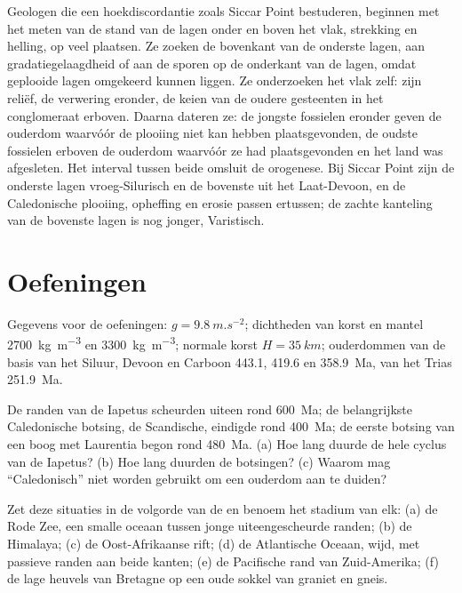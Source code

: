 \begin{inthefield}
Geologen die een hoekdiscordantie zoals Siccar Point bestuderen, beginnen met het meten van de
stand van de lagen onder en boven het vlak, strekking en helling, op veel plaatsen. Ze zoeken
de bovenkant van de onderste lagen, aan gradatiegelaagdheid of aan de sporen op de onderkant van de lagen,
omdat geplooide lagen omgekeerd kunnen liggen. Ze onderzoeken het vlak zelf: zijn reliëf, de
verwering eronder, de keien van de oudere gesteenten in het conglomeraat erboven. Daarna
dateren ze: de jongste fossielen eronder geven de ouderdom waarvóór de plooiing niet kan hebben plaatsgevonden,
de oudste fossielen erboven de ouderdom waarvóór ze had plaatsgevonden en het land was afgesleten.
Het interval tussen beide omsluit de orogenese. Bij Siccar Point zijn de onderste lagen
vroeg-Silurisch en de bovenste uit het Laat-Devoon, en de Caledonische plooiing, opheffing en erosie passen
ertussen; de zachte kanteling van de bovenste lagen is nog jonger, Varistisch.
\end{inthefield}

\section*{Oefeningen}\label{sec:b2:wilson-cycle:exercises}

Gegevens voor de oefeningen: $g = \qty{9.8}{m.s^{-2}}$; dichtheden van korst en mantel
\qty{2700}{kg.m^{-3}} en \qty{3300}{kg.m^{-3}}; normale korst $H = \qty{35}{km}$; ouderdommen van de
basis van het Siluur, Devoon en Carboon 443.1, 419.6 en \qty{358.9}{Ma}, van het
Trias \qty{251.9}{Ma}.

\begin{exercise}[$\star$]\label{exo:b2:wilson-cycle:1}
De randen van de Iapetus scheurden uiteen rond \qty{600}{Ma}; de belangrijkste Caledonische botsing, de
Scandische, eindigde rond \qty{400}{Ma}; de eerste botsing van een boog met Laurentia begon
rond \qty{480}{Ma}. (a) Hoe lang duurde de hele cyclus van de Iapetus? (b) Hoe lang duurden de
botsingen? (c) Waarom mag ``Caledonisch'' niet worden gebruikt om een ouderdom aan te duiden?
\end{exercise}

\begin{exercise}[$\star$]\label{exo:b2:wilson-cycle:2}
Zet deze situaties in de volgorde van de  en benoem het stadium van elk: (a) de
Rode Zee, een smalle oceaan tussen jonge uiteengescheurde randen; (b) de Himalaya; (c) de Oost-Afrikaanse
rift; (d) de Atlantische Oceaan, wijd, met passieve randen aan beide kanten; (e) de Pacifische rand
van Zuid-Amerika; (f) de lage heuvels van Bretagne op een oude sokkel van graniet en gneis.
\end{exercise}

